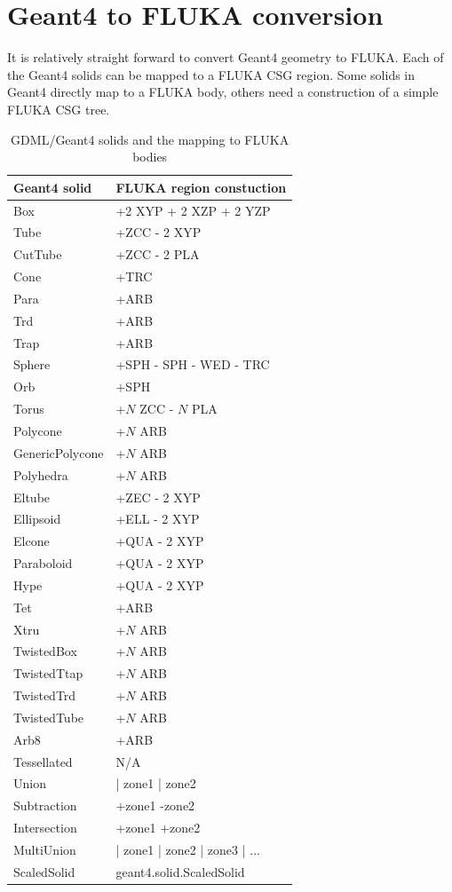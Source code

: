 \documentclass[final,5p,times,twocolumn]{elsarticle}
\begin{document}
\section{Geant4 to FLUKA conversion}
It is relatively straight forward to convert Geant4 geometry to FLUKA. Each of the Geant4 solids can be mapped to a FLUKA CSG region.
Some solids in Geant4 directly map to a FLUKA body, others need a construction of a simple FLUKA CSG tree. 


\begin{table}[hbt!]
\centering
\begin{tabular}{| l | l | } \hline
Geant4 solid			& FLUKA region constuction		\\ \hline
Box					& +2 XYP + 2 XZP + 2 YZP 		\\
Tube					& +ZCC - 2 XYP	 			\\
CutTube				& +ZCC - 2 PLA				\\
Cone				& +TRC						\\
Para					& +ARB						\\
Trd					& +ARB						\\
Trap					& +ARB						\\
Sphere				& +SPH - SPH  - WED - TRC		\\
Orb					& +SPH						\\
Torus				& +$N$ ZCC  - $N$ PLA			\\
Polycone				& +$N$ ARB					\\
GenericPolycone		& +$N$ ARB					\\
Polyhedra				& +$N$ ARB					\\
Eltube				& +ZEC  - 2 XYP				\\
Ellipsoid				& +ELL - 2 XYP		 			\\
Elcone				& +QUA - 2 XYP				\\
Paraboloid			& +QUA - 2 XYP				\\
Hype					& +QUA - 2 XYP				\\
Tet					& +ARB						\\
Xtru					& +$N$ ARB					\\
TwistedBox			& +$N$ ARB					\\
TwistedTtap			& +$N$ ARB					\\
TwistedTrd			& +$N$ ARB				 	\\
TwistedTube			& +$N$ ARB					\\
Arb8					& +ARB						\\
Tessellated			& N/A					 	\\
Union				& | zone1 | zone2				\\
Subtraction			& +zone1 -zone2				\\
Intersection			& +zone1 +zone2				\\
MultiUnion			& | zone1 | zone2 | zone3 | ...	\\
ScaledSolid			& geant4.solid.ScaledSolid		\\ \hline				
\end{tabular}
\caption{GDML/Geant4 solids and the mapping to FLUKA bodies}
\end{table}
\end{document}

